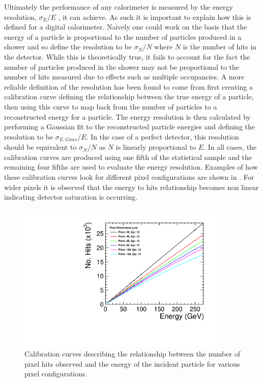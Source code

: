 Ultimately the performance of any calorimeter is measured by the energy resolution, $\sigma_E/E$ , it can achieve. As such it is important to explain how this is defined for a digital calorimeter. Naively one could work on the basis that the energy of a particle is proportional to the number of particles produced in a shower and so define the resolution to be $\sigma_N/N$ where $N$ is the number of hits in the detector. While this is theoretically true, it fails to account for the fact the number of particles produced in the shower may not be proportional to the number of hits measured due to effects such as multiple occupancies. A more reliable definition of the resolution has been found to come from first creating a calibration curve defining the relationship between the true energy of a particle, then using this curve to map back from the number of particles to a reconstructed energy for a particle. The energy resolution is then calculated by performing a Gaussian fit to the reconstructed particle energies and defining the resolution to be $\sigma_{E,Gaus}/E$. In the case of a perfect detector, this resolution should be equivalent to $\sigma_N/N$ as $N$ is linearly proportional to $E$. In all cases, the calibration curves are produced using one fifth of the statistical sample and the remaining four fifths are used to evaluate the energy resolution. Examples of how these calibration curves look for different pixel configurations are shown in . For wider pixels it is observed that the energy to hits relationship becomes non linear indicating detector saturation is occurring. 

\begin{figure}
  \centering
  \includegraphics[width=0.9\textwidth,keepaspectratio]{DECALStudies/fig/CalibrationCurves.pdf}
  \caption{Calibration curves describing the relationship between the number of pixel hits observed and the energy of the incident particle for various pixel configurations.}
  \label{fig:calibrationcurves}
\end{figure}

